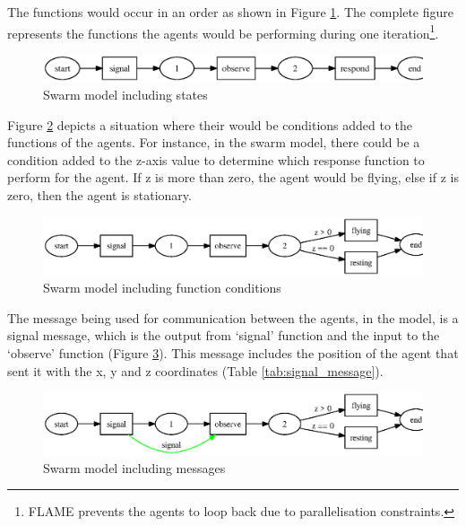The functions would occur in an order as shown in Figure
\ref{fig:swarm_1}. The complete figure represents the functions the agents would be performing during one iteration\footnote{FLAME prevents the agents to loop back due to
parallelisation constraints.}.



\begin{figure}[ht]
\begin{center}
\includegraphics*[scale=0.65]{swarm_1.ps}
\caption{Swarm model including states}
\label{fig:swarm_1}
\end{center}
\end{figure}

Figure \ref{fig:swarm_2} depicts a situation where their would be conditions added to the functions of the agents. For instance, in the swarm model, there could be a condition added to the z-axis value to determine which response function to perform for the agent. If z is more than zero, the agent would be flying, else if z is zero, then the agent is stationary.


\begin{figure}[ht]
\begin{center}
\includegraphics*[scale=0.65]{swarm_2.ps}
\caption{Swarm model including function conditions}
\label{fig:swarm_2}
\end{center}
\end{figure}

The message being used for communication between the agents, in the model, is a signal message, which is the output from `signal' function and the input to the `observe' function (Figure
\ref{fig:swarm_3}). This message includes the position of the agent that
sent it with the x, y and z coordinates (Table \ref{tab:signal_message}). 


\begin{figure}[ht]
\begin{center}
\includegraphics*[scale=0.65]{swarm_3.ps}
\caption{Swarm model including messages}
\label{fig:swarm_3}
\end{center}
\end{figure}



